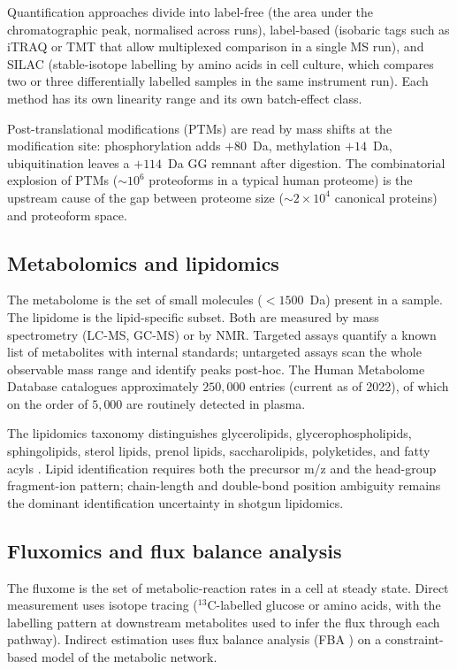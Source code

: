 Quantification approaches divide into label-free (the area under the
chromatographic peak, normalised across runs), label-based (isobaric
tags such as iTRAQ or TMT that allow multiplexed comparison in a
single MS run), and SILAC (stable-isotope labelling by amino acids in
cell culture, which compares two or three differentially labelled
samples in the same instrument run). Each method has its own
linearity range and its own batch-effect class.

Post-translational modifications (PTMs) are read by mass shifts at
the modification site: phosphorylation adds $+80$~Da, methylation
$+14$~Da, ubiquitination leaves a $+114$~Da GG remnant after digestion.
The combinatorial explosion of PTMs ($\sim 10^6$ proteoforms in a
typical human proteome) is the upstream cause of the gap between
proteome size ($\sim 2 \times 10^{4}$ canonical proteins) and
proteoform space.

\subsection{Metabolomics and lipidomics}

The metabolome is the set of small molecules ($<1500$~Da) present in a
sample. The lipidome is the lipid-specific subset. Both are measured
by mass spectrometry (LC-MS, GC-MS) or by NMR. Targeted assays
quantify a known list of metabolites with internal standards; untargeted
assays scan the whole observable mass range and identify peaks
post-hoc. The Human Metabolome Database \cite{paper:v6c11-wishart-hmdb-2022}
catalogues approximately $250,000$ entries (current as of 2022),
of which on the order of $5{,}000$ are routinely detected in plasma.

The lipidomics taxonomy distinguishes glycerolipids, glycerophospholipids,
sphingolipids, sterol lipids, prenol lipids, saccharolipids, polyketides,
and fatty acyls \cite{paper:v6c11-han-lipidomics-2016}. Lipid identification
requires both the precursor m/z and the head-group fragment-ion pattern;
chain-length and double-bond position ambiguity remains the dominant
identification uncertainty in shotgun lipidomics.

\subsection{Fluxomics and flux balance analysis}

The fluxome is the set of metabolic-reaction rates in a cell at steady
state. Direct measurement uses isotope tracing ($^{13}$C-labelled
glucose or amino acids, with the labelling pattern at downstream
metabolites used to infer the flux through each pathway). Indirect
estimation uses flux balance analysis (FBA \cite{paper:v6c11-orth-cobra-2010})
on a constraint-based model of the metabolic network.

